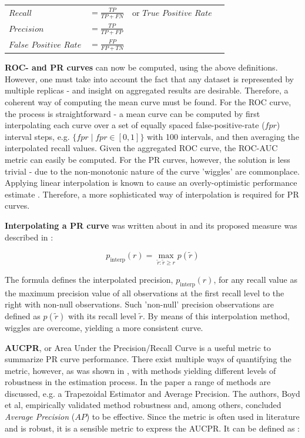 \documentclass{article}
\begin{document}
\begin{table}[ht]
\begin{tabular}{llll}
$Recall$ & $= \frac{TP}{TP+FN}$ & or $True$ $Positive$ $Rate$&  \\
$Precision$ & $= \frac{TP}{TP+FP}$ &  &  \\
$False$ $Positive$ $Rate$ & $= \frac{FP}{FP+TN}$ &  & 
\end{tabular}
\end{table}

\textbf{ROC- and PR curves} can now be computed, using the above definitions. However, one must take into account the fact that any dataset is represented by multiple replicas - and insight on aggregated results are desirable. Therefore, a coherent way of computing the mean curve must be found. For the ROC curve, the process is straightforward - a mean curve can be computed by first interpolating each curve over a set of equally spaced false-positive-rate ($fpr$) interval steps, e.g. $\{fpr \mid fpr \in [0, 1]\}$ with 100 intervals, and then averaging the interpolated recall values. Given the aggregated ROC curve, the ROC-AUC metric can easily be computed. For the PR curves, however, the solution is less trivial - due to the non-monotonic nature of the curve 'wiggles' are commonplace. Applying linear interpolation is known to cause an overly-optimistic performance estimate \citep{davis2006relationship}. Therefore, a more sophisticated way of interpolation is required for PR curves.

\textbf{Interpolating a PR curve} was written about in \citep{10.5555/576628} and its proposed measure was described in \citep{everingham2010pascal}:

\begin{equation}
p_{\text{interp}}(r)=\max_{\tilde{r}: \tilde{r} \geq r} p(\tilde{r})
\end{equation}

The formula defines the interpolated precision, $p_{\text{interp}}(r)$, for any recall value as the maximum precision value of all observations at the first recall level to the right with non-null observations. Such 'non-null' precision observations are defined as $p(\tilde{r})$ with its recall level $\tilde{r}$. By means of this interpolation method, wiggles are overcome, yielding a more consistent curve.

\textbf{AUCPR}, or Area Under the Precision/Recall Curve is a useful metric to summarize PR curve performance. There exist multiple ways of quantifying the metric, however, as was shown in \citep{boyd2013area}, with methods yielding different levels of robustness in the estimation process. In the paper a range of methods are discussed, e.g. a Trapezoidal Estimator and Average Precision. The authors, Boyd et al, empirically validated method robustness and, among others, concluded \textit{Average Precision} ($AP$) to be effective. Since the metric is often used in literature and is robust, it is a sensible metric to express the AUCPR. It can be defined as \citep{zhu2004recall}:
\end{document}
